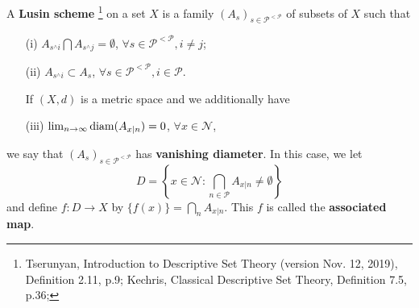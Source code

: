 \begin{definition}
A \textbf{Lusin scheme}
\footnote{
  Tserunyan, Introduction to Descriptive Set Theory (version Nov. 12, 2019), 
  Definition 2.11, p.9;
  Kechris, Classical Descriptive Set Theory, Definition 7.5, p.36;
}
on a set $X$ is a family 
$(A_s)_{s\in \mathcal{P}^{<\mathcal{P}}}$ of subsets of $X$ such that
\begin{enumerate}
  \item[(i)] $A_{s^\wedge i}\bigcap A_{s^\wedge j}=\emptyset$, 
             $\forall s\in \mathcal{P}^{<\mathcal{P}}, i\neq j$;
  \item[(ii)] $A_{s^\wedge i}\subset A_s$, 
              $\forall s\in \mathcal{P}^{<\mathcal{P}}, i\in \mathcal{P}$.

If $(X,d)$ is a metric space and we additionally have

  \item[(iii)] $\lim_{n\to\infty} \operatorname*{diam}(A_{x|n})=0$, $\forall x\in\mathcal{N}$,
\end{enumerate}
we say that $(A_s)_{s\in \mathcal{P}^{<\mathcal{P}}}$ has \textbf{vanishing
diameter}. In this case, we let
\[
  D=\left\{
      x\in\mathcal{N}: \bigcap_{n\in\mathcal{P}} A_{x|n}\neq\emptyset
    \right\}
\]
and define $f:D\to X$ by $\{f(x)\}=\bigcap_n A_{x|n}$. This $f$ is called the 
\textbf{associated map}.
\end{definition}

